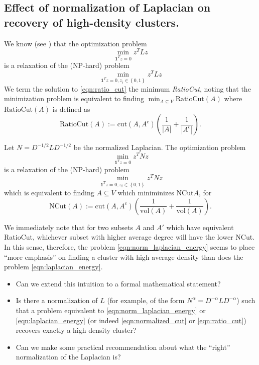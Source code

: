 \documentclass{article}
\newcommand{\abs}[1]{\left \lvert #1 \right \rvert}
\newcommand{\set}[1]{\left\{#1\right\}}
\newcommand{\vol}{\text{vol}}
\newcommand{\1}{\mathbb{I}}
\theoremstyle{alden}
\theoremstyle{aldenthm}
\theoremstyle{definition}
\theoremstyle{remark}
\begin{document}
\subsection{Effect of normalization of Laplacian on recovery of high-density clusters.}

We know (see \citep{vonluxburg07}) that the optimization problem
\begin{equation}
\label{eqn:laplacian_energy}
\min_{\mathbf{1}^T z = 0} z^T L z
\end{equation}
is a relaxation of the (NP-hard) problem
\begin{equation}
\label{eqn:ratio_cut}
\min_{\mathbf{1}^T z = 0, z_i \in \set{0,1}} z^T L z
\end{equation}
We term the solution to \eqref{eqn:ratio_cut} the minimum \textit{RatioCut}, noting that the minimization problem is equivalent to finding $\min_{A \subseteq V} \mathrm{RatioCut}(A)$ where $\mathrm{RatioCut}(A)$ is defined as
\begin{equation}
\mathrm{RatioCut}(A) := \mathrm{cut}(A,A^c)\left(\frac{1}{\abs{A}} + \frac{1}{\abs{A^c}}\right).
\end{equation}

Let $N = D^{-1/2}LD^{-1/2}$ be the normalized Laplacian. The optimization problem
\begin{equation}
\label{eqn:norm_laplacian_energy}
\min_{\mathbf{1}^T z = 0} z^T N z
\end{equation}
is a relaxation of the (NP-hard) problem
\begin{equation}
\label{eqn:normalized_cut}
\min_{\mathbf{1}^T z = 0, z_i \in \set{0,1}} z^T N z
\end{equation}
which is equivalent to finding $A \subseteq V$ which miniminizes $\mathrm{NCut}{A}$, for
\begin{equation*}
\mathrm{NCut}(A) := \mathrm{cut}(A,A^c)\left(\frac{1}{\vol(A)} + \frac{1}{\vol(A)}\right).
\end{equation*}

We immediately note that for two subsets $A$ and $A'$ which have equivalent \textrm{RatioCut}, whichever subset with higher average degree will have the lower \textrm{NCut}. In this sense, therefore, the problem \eqref{eqn:norm_laplacian_energy} seems to place ``more emphasis'' on finding a cluster with high average density than does the problem \eqref{eqn:laplacian_energy}. 
\begin{itemize}
	\item Can we extend this intuition to a formal mathematical statement?
	\item Is there a normalization of $L$ (for example, of the form $N^{\alpha} = D^{-\alpha}LD^{-\alpha}$) such that a problem equivalent to \eqref{eqn:norm_laplacian_energy} or \eqref{eqn:laplacian_energy} (or indeed \eqref{eqn:normalized_cut} or \eqref{eqn:ratio_cut}) recovers exactly a high density cluster?
	\item Can we make some practical recommendation about what the ``right'' normalization of the Laplacian is?
\end{itemize}
\end{document}
